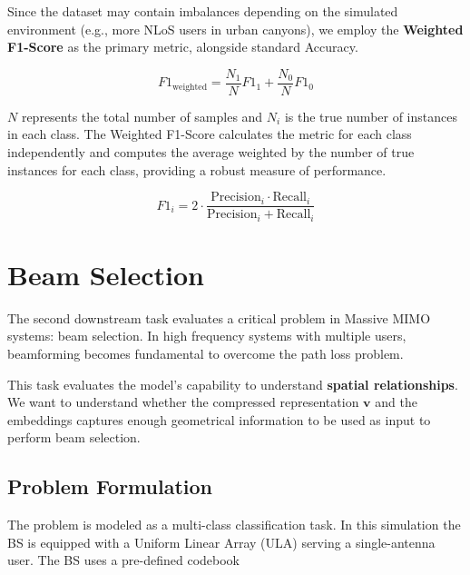 Since the dataset may contain imbalances depending on the simulated environment (e.g., more NLoS users in urban canyons), we employ the \textbf{Weighted F1-Score} as the primary metric, alongside standard Accuracy.

\begin{equation}
    F1_{\text{weighted}} = \frac{N_1}{N} F1_1 + \frac{N_0}{N} F1_0
\end{equation}


$N$ represents the total number of samples and $N_i$ is the true number of instances in each class. The Weighted F1-Score calculates the metric for each class independently and computes the average weighted by the number of true instances for each class, providing a robust measure of performance. 

\begin{equation}
    F1_i = 2 \cdot \frac{\text{Precision}_i \cdot \text{Recall}_i}{\text{Precision}_i + \text{Recall}_i}
\end{equation}

\section{Beam Selection}\label{sec:task_beam}

The second downstream task evaluates a critical problem in Massive MIMO systems: beam selection. In high frequency systems with multiple users, beamforming becomes fundamental to overcome the path loss problem. 

This task evaluates the model's capability to understand \textbf{spatial relationships}. We want to understand whether the compressed representation $\mathbf{v}$ and the embeddings captures enough geometrical information to be used as input to perform beam selection.

\subsection{Problem Formulation}\label{sec:task_beam_problem}

The problem is modeled as a multi-class classification task. In this simulation the BS is equipped with a Uniform Linear Array (ULA) serving a single-antenna user. The BS uses a pre-defined codebook

